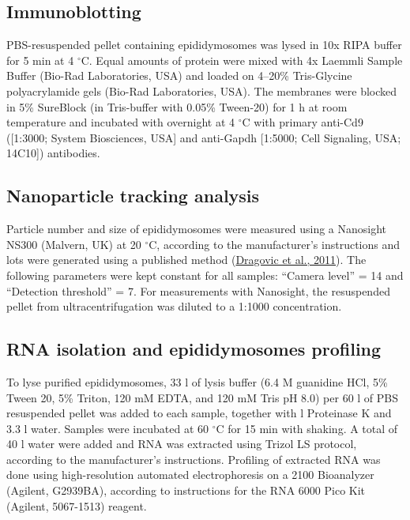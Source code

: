 \documentclass[12pt,twoside]{reedthesis}
\begin{document}
\hypertarget{immunoblotting}{%
\subsection{Immunoblotting}\label{immunoblotting}}

PBS-resuspended pellet containing epididymosomes was lysed in 10x RIPA
buffer for 5 min at 4 \(^{\circ}\)C. Equal amounts of protein were mixed
with 4x Laemmli Sample Buffer (Bio-Rad Laboratories, USA) and loaded on
4--20\% Tris-Glycine polyacrylamide gels (Bio-Rad Laboratories, USA). The
membranes were blocked in 5\% SureBlock (in Tris-buffer with 0.05\%
Tween-20) for 1 h at room temperature and incubated with overnight at 4
\(^{\circ}\)C with primary anti-Cd9 ({[}1:3000; System Biosciences, USA{]} and
anti-Gapdh {[}1:5000; Cell Signaling, USA; 14C10{]}) antibodies.

\hypertarget{nanoparticle-tracking-analysis}{%
\subsection{Nanoparticle tracking analysis}\label{nanoparticle-tracking-analysis}}

Particle number and size of epididymosomes were measured using a
Nanosight NS300 (Malvern, UK) at 20 \(^{\circ}\)C, according to the
manufacturer's instructions and lots were generated using a published
method (\protect\hyperlink{ref-dragovic_2011}{Dragovic et al., 2011}). The following parameters were kept constant for
all samples: ``Camera level'' = 14 and ``Detection threshold'' = 7. For
measurements with Nanosight, the resuspended pellet from
ultracentrifugation was diluted to a 1:1000 concentration.

\hypertarget{rna-isolation-and-epididymosomes-profiling}{%
\subsection{RNA isolation and epididymosomes profiling}\label{rna-isolation-and-epididymosomes-profiling}}

To lyse purified epididymosomes, 33 \textmu l of lysis buffer (6.4 M
guanidine HCl, 5\% Tween 20, 5\% Triton, 120 mM EDTA, and 120 mM Tris pH
8.0) per 60 \textmu l of PBS resuspended pellet was added to each
sample, together with \textmu l Proteinase K and 3.3 \textmu l water.
Samples were incubated at 60 \(^{\circ}\)C for 15 min with shaking. A
total of 40 \textmu l water were added and RNA was extracted using
Trizol LS protocol, according to the manufacturer's instructions.
Profiling of extracted RNA was done using high-resolution automated
electrophoresis on a 2100 Bioanalyzer (Agilent, G2939BA), according to
instructions for the RNA 6000 Pico Kit (Agilent, 5067-1513) reagent.
\end{document}
